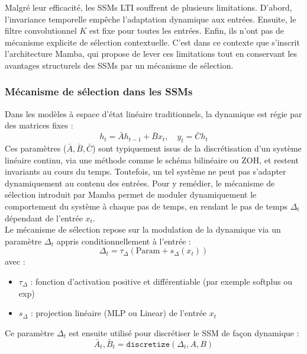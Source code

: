 Malgré leur efficacité, les SSMs LTI souffrent de plusieurs limitations. D’abord, l’invariance temporelle empêche l’adaptation dynamique aux entrées. Ensuite, le filtre convolutionnel $K$ est fixe pour toutes les entrées. Enfin, ils n’ont pas de mécanisme explicite de sélection contextuelle. C’est dans ce contexte que s’inscrit l’architecture Mamba, qui propose de lever ces limitations tout en conservant les avantages structurels des SSMs par un mécanisme de sélection.

\subsubsection{Mécanisme de sélection dans les SSMs}

Dans les modèles à espace d’état linéaire traditionnels, la dynamique est régie par des matrices fixes :
\begin{equation}
    h_t = \bar{A} h_{t-1} + \bar{B} x_t, \quad y_t = \bar{C} h_t
\end{equation}
Ces paramètres (\(\bar{A}, \bar{B}, \bar{C}\)) sont typiquement issus de la discrétisation d’un système linéaire continu, via une méthode comme le schéma bilinéaire ou ZOH, et restent invariants au cours du temps. Toutefois, un tel système ne peut pas s’adapter dynamiquement au contenu des entrées. Pour y remédier, le mécanisme de sélection introduit par Mamba permet de moduler dynamiquement le comportement du système à chaque pas de temps, en rendant le pas de temps \(\Delta_t\) dépendant de l’entrée \(x_t\).\\

Le mécanisme de sélection repose sur la modulation de la dynamique via un paramètre $\Delta_t$ appris conditionnellement à l’entrée :
\begin{equation}
    \Delta_t = \tau_\Delta (\text{Param} + s_\Delta(x_t))
\end{equation}
avec :
\begin{itemize}
    \item $\tau_\Delta$ : fonction d’activation positive et différentiable (par exemple softplus ou exp)
    \item $s_\Delta$ : projection linéaire (MLP ou Linear) de l’entrée $x_t$
\end{itemize}

Ce paramètre $\Delta_t$ est ensuite utilisé pour discrétiser le SSM de façon dynamique :
\begin{equation}
    \bar{A}_t, \bar{B}_t = \texttt{discretize}(\Delta_t, A, B)
\end{equation}

